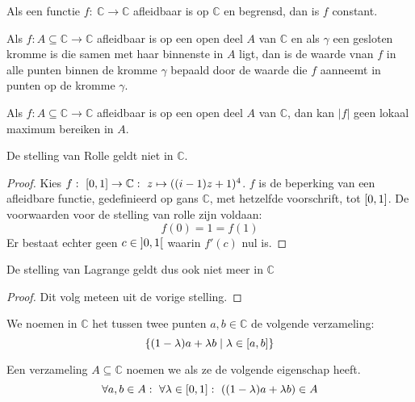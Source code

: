 \documentclass[main.tex]{subfiles}
\begin{document}
\begin{st}
  Als een functie $f:\ \mathbb{C} \rightarrow \mathbb{C}$ afleidbaar is op $\mathbb{C}$ en begrensd, dan is $f$ constant.
\zb
\end{st}

\begin{st}
  Als $f: A \subseteq \mathbb{C} \rightarrow \mathbb{C}$ afleidbaar is op een open deel $A$ van $\mathbb{C}$ en als $\gamma$ een gesloten kromme is die samen met haar binnenste in $A$ ligt, dan is de waarde vnan $f$ in alle punten binnen de kromme $\gamma$ bepaald door de waarde die $f$ aanneemt in punten op de kromme $\gamma$.
\zb
\end{st}

\begin{st}
  Als $f: A \subseteq \mathbb{C} \rightarrow \mathbb{C}$ afleidbaar is op een open deel $A$ van $\mathbb{C}$, dan kan $|f|$ geen lokaal maximum bereiken in $A$.
\zb
\end{st}

\begin{gst}
  De stelling van Rolle geldt niet in $\mathbb{C}$.

  \begin{proof}
    Kies $f:\ \interval{0}{1} \rightarrow \mathbb{C}:\ z \mapsto ((i-1)z+1)^{4}$.
    $f$ is de beperking van een afleidbare functie, gedefinieerd op gans $\mathbb{C}$, met hetzelfde voorschrift, tot $\interval{0}{1}$.
    De voorwaarden voor de stelling van rolle zijn voldaan:
    \[ f(0) = 1 = f(1) \]
    Er bestaat echter geen $c\in \interval[open]{0}{1}$ waarin $f'(c)$ nul is.
  \end{proof}
\end{gst}
\begin{gst}
  De stelling van Lagrange geldt dus ook niet meer in $\mathbb{C}$

  \begin{proof}
    Dit volg meteen uit de vorige stelling.
  \end{proof}
\end{gst}

\begin{de}
  We noemen in $\mathbb{C}$ het  tussen twee punten $a,b\in \mathbb{C}$ de volgende verzameling:
  \[ \{(1-\lambda)a+\lambda b\mid \lambda \in \interval{a}{b} \} \]
\end{de}

\begin{de}
  Een verzameling $A \subseteq \mathbb{C}$ noemen we  als ze de volgende eigenschap heeft.
  \[ \forall a,b \in A:\ \forall \lambda \in \interval{0}{1}:\ ((1-\lambda)a+\lambda b) \in A \]
\end{de}
\end{document}
